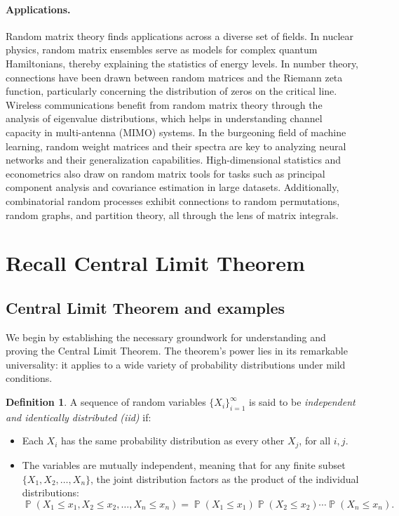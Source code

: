 \documentclass[letterpaper,11pt,oneside,reqno]{book}
\numberwithin{equation}{chapter}  %
\theoremstyle{definition}
\newtheorem{definition}[proposition]{Definition}
\begin{document}
\paragraph{Applications.}
Random matrix theory finds applications across a diverse set
of fields. In nuclear physics, random matrix ensembles serve
as models for complex quantum Hamiltonians, thereby
explaining the statistics of energy levels. In number
theory, connections have been drawn between random matrices
and the Riemann zeta function, particularly concerning the
distribution of zeros on the critical line. Wireless
communications benefit from random matrix theory through the
analysis of eigenvalue distributions, which helps in
understanding channel capacity in multi-antenna (MIMO) systems. In the burgeoning field of
machine learning, random weight matrices and their spectra
are key to analyzing neural networks and their
generalization capabilities. High-dimensional statistics
and econometrics
also draw on random matrix tools for tasks such as principal
component analysis and covariance estimation in large
datasets. Additionally, combinatorial random processes
exhibit connections to random permutations, random graphs,
and partition theory, all through the lens of matrix
integrals.

\section{Recall Central Limit Theorem}

\subsection{Central Limit Theorem and examples}

We begin by establishing the necessary groundwork for understanding and proving
the Central Limit Theorem. The theorem's power lies in its remarkable universality:
it applies to a wide variety of probability distributions under mild conditions.

\begin{definition}
A sequence of random variables $\{X_i\}_{i=1}^{\infty}$ is said to be
\emph{independent and identically distributed (iid)}
if:

\begin{itemize}
    \item Each $X_i$ has the same probability distribution as every other $X_j$, for all $i, j$.
    \item The variables are mutually independent, meaning that for any finite subset $\{X_1, X_2, \dots, X_n\}$, the joint distribution factors as the product of the individual distributions:
    \[
			\operatorname{\mathbb{P}}(X_1 \leq x_1, X_2 \leq x_2, \dots, X_n \leq x_n)
			=
			\operatorname{\mathbb{P}}(X_1 \leq x_1)
			\operatorname{\mathbb{P}}(X_2 \leq x_2) \cdots \operatorname{\mathbb{P}}(X_n \leq x_n).
    \]
\end{itemize}
\end{definition}
\end{document}
